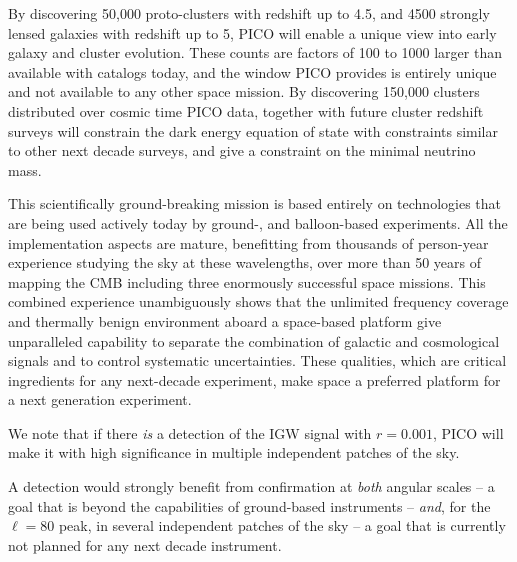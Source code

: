 \documentclass[PICOReport.tex]{subfiles}
\begin{document}
By discovering 50,000 proto-clusters with redshift up to 4.5, and  4500 strongly lensed galaxies with redshift up to 5, PICO will enable a unique view into early galaxy and cluster evolution. These counts are factors of 100 to 1000 larger than available with catalogs today, and the window PICO provides is entirely unique and not available to any other space mission. By discovering 150,000 clusters distributed over cosmic time PICO data, together with future cluster redshift surveys will constrain the dark energy equation of state with constraints similar to other next decade surveys, and give a constraint on the minimal neutrino mass. 

This scientifically ground-breaking mission is based entirely on technologies that are being used actively today by ground-, and balloon-based experiments. All the implementation aspects are mature, benefitting from thousands of person-year experience studying the sky at these wavelengths, over more than 50 years of mapping the CMB including three enormously successful space missions. This combined experience unambiguously shows that the unlimited frequency coverage and thermally benign environment aboard a space-based platform give unparalleled capability to separate the combination of galactic and cosmological signals and to control systematic uncertainties. These qualities, which are critical ingredients for any next-decade experiment, make space a preferred platform for a next generation experiment. 




We note that if there {\it is} a detection of the \ac{IGW} signal with $r=0.001$, PICO will make it with high significance in multiple independent patches of the sky. 


A detection would strongly benefit from confirmation at {\it both} angular 
scales -- a goal that is beyond the capabilities of ground-based instruments -- {\it and}, for the $\ell = 80$ peak, 
in several independent patches of the sky -- a goal that is currently not planned for any next decade instrument. 
\end{document}
